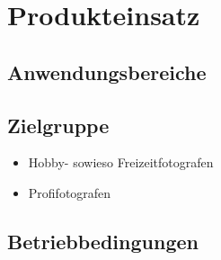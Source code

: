 \section{Produkteinsatz}

\subsection{Anwendungsbereiche}

\subsection{Zielgruppe}
	\begin{itemize}
		\item Hobby- sowieso Freizeitfotografen
		\item Profifotografen		
	\end{itemize}

\subsection{Betriebbedingungen}
